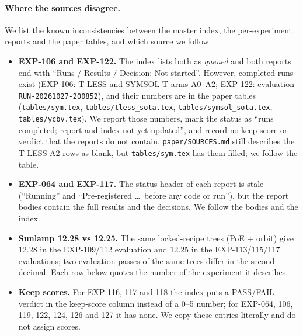 \paragraph{Where the sources disagree.}
We list the known inconsistencies between the master index, the per-experiment reports and the paper tables, and which source we follow.
\begin{itemize}
\item \textbf{EXP-106 and EXP-122.} The index lists both as \emph{queued} and both reports end with ``Runs / Results / Decision: Not started''. However, completed runs exist (EXP-106: T-LESS and SYMSOL-T arms A0--A2; EXP-122: evaluation \texttt{RUN-20261027-200852}), and their numbers are in the paper tables (\texttt{tables/sym.tex}, \texttt{tables/tless\_sota.tex}, \texttt{tables/symsol\_sota.tex}, \texttt{tables/ycbv.tex}). We report those numbers, mark the status as ``runs completed; report and index not yet updated'', and record no keep score or verdict that the reports do not contain. \texttt{paper/SOURCES.md} still describes the T-LESS A2 rows as blank, but \texttt{tables/sym.tex} has them filled; we follow the table.
\item \textbf{EXP-064 and EXP-117.} The status header of each report is stale (``Running'' and ``Pre-registered \ldots\ before any code or run''), but the report bodies contain the full results and the decisions. We follow the bodies and the index.
\item \textbf{Sunlamp 12.28 vs 12.25.} The same locked-recipe trees (PoE + orbit) give 12.28 in the EXP-109/112 evaluation and 12.25 in the EXP-113/115/117 evaluations; two evaluation passes of the same trees differ in the second decimal. Each row below quotes the number of the experiment it describes.
\item \textbf{Keep scores.} For EXP-116, 117 and 118 the index puts a PASS/FAIL verdict in the keep-score column instead of a 0--5 number; for EXP-064, 106, 119, 122, 124, 126 and 127 it has none. We copy these entries literally and do not assign scores.
\end{itemize}

